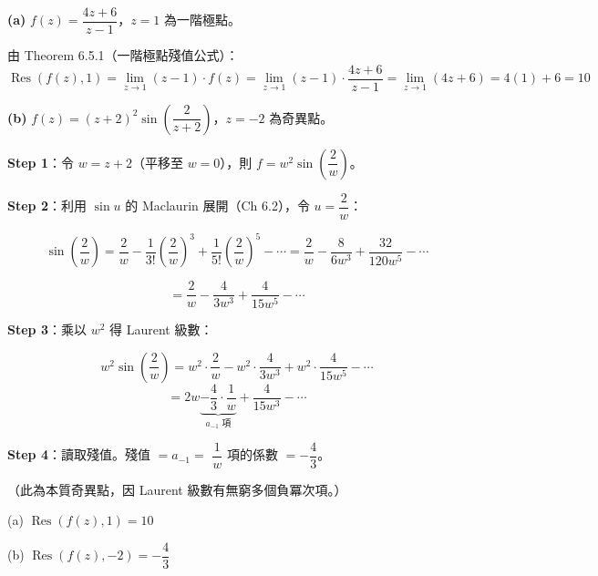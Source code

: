 \documentclass[12pt,a4paper]{article}
\newcommand{\Res}{\operatorname{Res}}
\begin{document}
\begin{solbox}[解]
\textbf{(a)} $f(z)=\dfrac{4z+6}{z-1}$，$z=1$ 為一階極點。

由 Theorem 6.5.1（一階極點殘值公式）：
$$\Res(f(z),1)=\lim_{z\to 1}(z-1)\cdot f(z)=\lim_{z\to 1}(z-1)\cdot\frac{4z+6}{z-1}=\lim_{z\to 1}(4z+6)=4(1)+6=10$$

\textbf{(b)} $f(z)=(z+2)^2\sin\!\left(\dfrac{2}{z+2}\right)$，$z=-2$ 為奇異點。

\textbf{Step 1}：令 $w=z+2$（平移至 $w=0$），則 $f=w^2\sin\!\left(\dfrac{2}{w}\right)$。

\textbf{Step 2}：利用 $\sin u$ 的 Maclaurin 展開（Ch 6.2），令 $u=\dfrac{2}{w}$：

$$\sin\!\left(\frac{2}{w}\right)=\frac{2}{w}-\frac{1}{3!}\left(\frac{2}{w}\right)^3+\frac{1}{5!}\left(\frac{2}{w}\right)^5-\cdots=\frac{2}{w}-\frac{8}{6w^3}+\frac{32}{120w^5}-\cdots$$

$$=\frac{2}{w}-\frac{4}{3w^3}+\frac{4}{15w^5}-\cdots$$

\textbf{Step 3}：乘以 $w^2$ 得 Laurent 級數：

$$w^2\sin\!\left(\frac{2}{w}\right)=w^2\cdot\frac{2}{w}-w^2\cdot\frac{4}{3w^3}+w^2\cdot\frac{4}{15w^5}-\cdots$$
$$=2w\underbrace{-\frac{4}{3}\cdot\frac{1}{w}}_{a_{-1}\text{ 項}}+\frac{4}{15w^3}-\cdots$$

\textbf{Step 4}：讀取殘值。殘值 $=a_{-1}=$ $\dfrac{1}{w}$ 項的係數 $=-\dfrac{4}{3}$。

（此為本質奇異點，因 Laurent 級數有無窮多個負冪次項。）
\end{solbox}

\begin{ansbox}
(a) $\Res(f(z),1)=\boxed{10}$

(b) $\Res(f(z),-2)=\boxed{-\dfrac{4}{3}}$
\end{ansbox}
\end{document}
